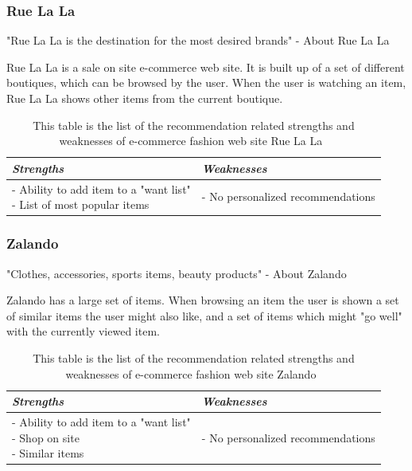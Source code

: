 \subsubsection{Rue La La} %
\label{par:rue_la_la}
    "Rue La La is the destination for the most desired brands" - About Rue La La~\cite{RueLaLa}

    Rue La La is a sale on site e-commerce web site.
    It is built up of a set of different boutiques, which can be browsed by the user.
    When the user is watching an item, Rue La La shows other items from the current boutique.

    \begin{table}[H]
        \centering
        \begin{tabular}{l|l}
            \toprule
            \emph{Strengths} & \emph{Weaknesses} \\ \hline
            \pbox{9cm}{
                - Ability to add item to a "want list" \\
                - List of most popular items
            } & \pbox{9cm}{
                - No personalized recommendations \\
            } \\ \bottomrule
        \end{tabular}
        \caption[Recommendation related strengths and weaknesses of Rue La La~\cite{RueLaLa}]{This table is the list of the recommendation related strengths and weaknesses of e-commerce fashion web site Rue La La~\cite{RueLaLa}}
        \label{table:ecommenreceRueLaLa}
    \end{table}

\subsubsection{Zalando} %
\label{par:zalando}
    "Clothes, accessories, sports items, beauty products" - About Zalando~\cite{Zalando}

    Zalando has a large set of items.
    When browsing an item the user is shown a set of similar items the user might also like, and a set of items which might "go well"  with the currently viewed item.
    \begin{table}[H]
        \centering
        \begin{tabular}{l|l}
            \toprule
            \emph{Strengths} & \emph{Weaknesses} \\ \hline
            \pbox{9cm}{
                - Ability to add item to a "want list" \\
                - Shop on site \\
                - Similar items
            } & \pbox{9cm}{
                - No personalized recommendations \\
            } \\ \bottomrule
        \end{tabular}
        \caption[Recommendation related strengths and weaknesses of Zalando~\cite{Zalando}]{This table is the list of the recommendation related strengths and weaknesses of e-commerce fashion web site Zalando~\cite{Zalando}}
        \label{table:ecommenreceZalando}
    \end{table}

